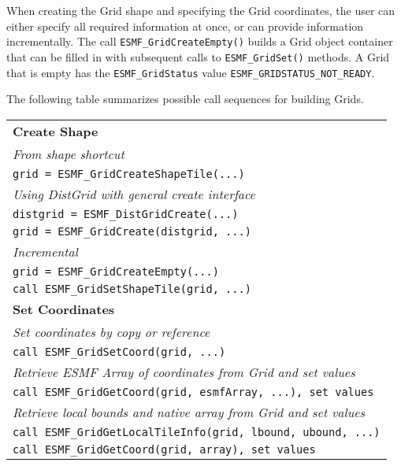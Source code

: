 When creating the Grid shape and specifying the Grid coordinates,
the user can either specify all required information at once,
or can provide information incrementally.  The call
{\tt ESMF\_GridCreateEmpty()} builds a Grid object
container that can be filled in with subsequent calls to 
{\tt ESMF\_GridSet()} methods.  A Grid that is empty
has the {\tt ESMF\_GridStatus} value
{\tt ESMF\_GRIDSTATUS\_NOT\_READY}.

The following table summarizes possible call sequences
for building Grids.

\begin{tabular}{|l|}
\hline
{\bf Create Shape} \\
{\it From shape shortcut} \\
{\tt grid = ESMF\_GridCreateShapeTile(...)} \\
{\it Using DistGrid with general create interface} \\
{\tt distgrid = ESMF\_DistGridCreate(...)} \\
{\tt grid = ESMF\_GridCreate(distgrid, ...)} \\
{\it Incremental} \\
{\tt grid = ESMF\_GridCreateEmpty(...)} \\
{\tt call ESMF\_GridSetShapeTile(grid, ...)} \\ \hline
{\bf Set Coordinates} \\
{\it Set coordinates by copy or reference} \\
{\tt call ESMF\_GridSetCoord(grid, ...)} \\
{\it Retrieve ESMF Array of coordinates from Grid and set values} \\
{\tt call ESMF\_GridGetCoord(grid, esmfArray, ...), set values} \\
{\it Retrieve local bounds and native array from Grid and set values} \\
{\tt call ESMF\_GridGetLocalTileInfo(grid, lbound, ubound, ...)} \\
{\tt call ESMF\_GridGetCoord(grid, array), set values} \\ \hline
\end{tabular}
